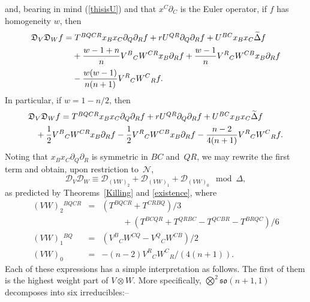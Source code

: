 \documentclass[a4paper,12pt]{amsart}
\begin{document}
and, bearing in mind (\ref{thisisU}) and that $x^C\partial_C$ is the Euler
operator, if $f$ has homogeneity $w$, then
$$\begin{array}l{\mathfrak D}_V{\mathfrak D}_Wf=
T^{BQCR}x_Bx_C\partial_Q\partial_Rf
+rU^{QR}\partial_Q\partial_Rf+U^{BC}x_Bx_C\widetilde\Delta f\\[5pt]
\phantom{{\mathfrak D}_V{\mathfrak D}_Wf=}\displaystyle
+\frac{w-1+n}{n}V^B{}_CW^{CR}x_B\partial_Rf
+\frac{w-1}{n}V^R{}_CW^{CB}x_B\partial_Rf\\[9pt]
\phantom{{\mathfrak D}_V{\mathfrak D}_Wf=}\displaystyle
-\frac{w(w-1)}{n(n+1)}V^R{}_CW^C{}_Rf.
\end{array}$$
In particular, if $w=1-n/2$, then
$$\begin{array}l{\mathfrak D}_V{\mathfrak D}_Wf=
T^{BQCR}x_Bx_C\partial_Q\partial_Rf
+rU^{QR}\partial_Q\partial_Rf+U^{BC}x_Bx_C\widetilde\Delta f\\[5pt]
\phantom{X}\displaystyle+\frac{1}{2}V^B{}_CW^{CR}x_B\partial_Rf
-\frac{1}{2}V^R{}_CW^{CB}x_B\partial_Rf-\frac{n-2}{4(n+1)}V^R{}_CW^C{}_Rf.
\end{array}$$
Noting that $x_Bx_C\partial_Q\partial_R$ is symmetric in $BC$ and~$QR$, we may
rewrite the first term and obtain, upon restriction to~${\mathcal N}$,
\begin{equation}\label{relations}
{\mathcal D}_V{\mathcal D}_W\equiv{\mathcal D}_{(VW)_2}+{\mathcal D}_{(VW)_1}
+{\mathcal D}_{(VW)_0}\mod\Delta,\end{equation}
as predicted by Theorems~\ref{Killing} and \ref{existence}, where
$$\begin{array}{rcl}
(VW)_2{}^{BQCR}&=&(T^{BQCR}+T^{CRBQ})/3\\
                &&\phantom{XXX}+(T^{BCQR}+T^{QRBC}-T^{QCBR}-T^{BRQC})/6\\[3pt]
(VW)_1{}^{BQ}&=&(V^B{}_CW^{CQ}-V^Q{}_CW^{CB})/2\\[3pt]
(VW)_0&=&-(n-2)V^R{}_CW^C{}_R/(4(n+1)).
\end{array}$$
Each of these expressions has a simple interpretation as follows. The first of
them is the highest weight part of $V\otimes W$. More specifically,
$\bigotimes^2{\mathfrak {so}}(n+1,1)$ decomposes into six irreducibles:--
\end{document}
